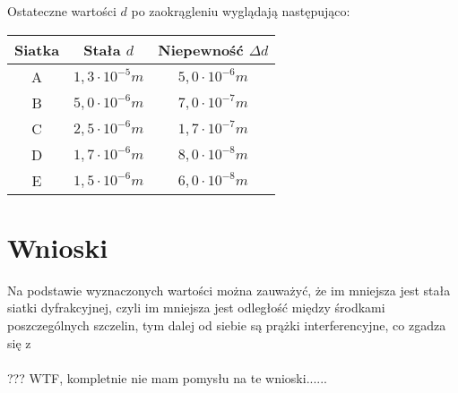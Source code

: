 \documentclass[10pt,a4paper]{article}
\begin{document}
Ostateczne wartości $d$ po zaokrągleniu wyglądają następująco:

\begin{center}
\begin{tabular}{|c|c|c|}
\hline
Siatka & Stała $d$ & Niepewność $\Delta d$\\
\hline
A & $1,3 \cdot 10^{-5} m$ & $5,0 \cdot 10^{-6} m$\\
\hline
B & $5,0 \cdot 10^{-6} m$ & $7,0 \cdot 10^{-7} m$ \\
\hline
C & $2,5 \cdot 10^{-6} m$ & $1,7 \cdot 10^{-7} m$\\
\hline
D & $1,7 \cdot 10^{-6} m$ & $8,0 \cdot 10^{-8} m$\\
\hline
E & $1,5 \cdot 10^{-6} m$ & $6,0 \cdot 10^{-8} m$\\
\hline
\end{tabular}
\end{center}

\section*{Wnioski}

Na podstawie wyznaczonych wartości można zauważyć, że im mniejsza jest stała siatki dyfrakcyjnej, czyli im mniejsza jest odległość między środkami poszczególnych szczelin, tym dalej od siebie są prążki interferencyjne, co zgadza się z \\ \\??? WTF, kompletnie nie mam pomysłu na te wnioski...... 	 
\end{document}
